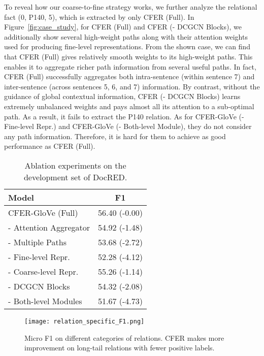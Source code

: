 \documentclass{article}
\begin{document}
To reveal how our coarse-to-fine strategy works, we further analyze the relational fact (0, P140, 5), which is extracted by only CFER (Full). 
In Figure~\ref{fig:case_study}, for CFER (Full) and CFER (- DCGCN Blocks), we additionally show several high-weight paths along with their attention weights used for producing fine-level representations. 
From the shown case, we can find that CFER (Full) gives relatively smooth weights to its high-weight paths. 
This enables it to aggregate richer path information from several useful paths. 
In fact, CFER (Full) successfully aggregates both intra-sentence (within sentence 7) and inter-sentence (across sentences 5, 6, and 7) information. 
By contrast, without the guidance of global contextual information, CFER (- DCGCN Blocks) learns extremely unbalanced weights and pays almost all its attention to a sub-optimal path. 
As a result, it fails to extract the P140 relation. 
As for CFER-GloVe (- Fine-level Repr.) and CFER-GloVe (- Both-level Module), they do not consider any path information. 
Therefore, it is hard for them to achieve as good performance as CFER (Full). 

\begin{table}[t]
\centering
\setlength{\tabcolsep}{10pt}
\begin{tabular}{l | c}
\toprule
\textbf{Model} & \textbf{F1}\\
\midrule
\midrule
CFER-GloVe (Full) & 56.40 (-0.00) \\
\midrule
- Attention Aggregator & 54.92 (-1.48) \\
- Multiple Paths & 53.68 (-2.72) \\
- Fine-level Repr. & 52.28 (-4.12) \\
\midrule
- Coarse-level Repr. & 55.26 (-1.14) \\
- DCGCN Blocks & 54.32 (-2.08) \\
\midrule
- Both-level Modules & 51.67 (-4.73) \\
\bottomrule
\end{tabular}
\caption{Ablation experiments on the development set of DocRED. }
\label{tab:ablation_rlt}
\end{table}

\begin{figure}[t]
\centering
\texttt{[image: relation\_specific\_F1.png]}
\caption{
Micro F1 on different categories of relations. 
CFER makes more improvement on long-tail relations with fewer positive labels. 
}
\label{fig:relation_f1}
\end{figure}
\end{document}
